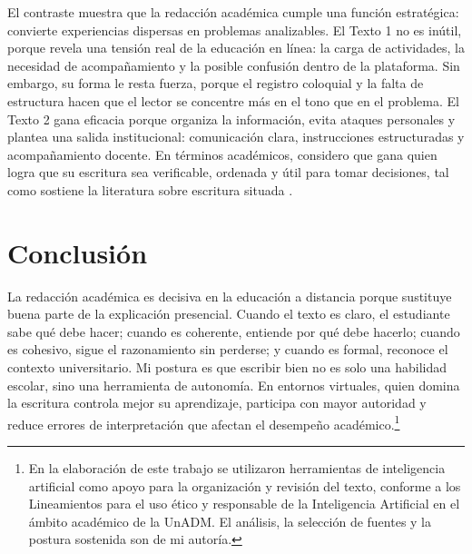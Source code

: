 \documentclass[
	spanish, %
	letterpaper, oneside
]{article}
\begin{document}
El contraste muestra que la redacción académica cumple una función estratégica: convierte experiencias dispersas en problemas analizables. El Texto 1 no es inútil, porque revela una tensión real de la educación en línea: la carga de actividades, la necesidad de acompañamiento y la posible confusión dentro de la plataforma. Sin embargo, su forma le resta fuerza, porque el registro coloquial y la falta de estructura hacen que el lector se concentre más en el tono que en el problema. El Texto 2 gana eficacia porque organiza la información, evita ataques personales y plantea una salida institucional: comunicación clara, instrucciones estructuradas y acompañamiento docente. En términos académicos, considero que gana quien logra que su escritura sea verificable, ordenada y útil para tomar decisiones, tal como sostiene la literatura sobre escritura situada \citep{vitoriaEscrituraAcademicaFormacion2019}.

\section{Conclusión}

La redacción académica es decisiva en la educación a distancia porque sustituye buena parte de la explicación presencial. Cuando el texto es claro, el estudiante sabe qué debe hacer; cuando es coherente, entiende por qué debe hacerlo; cuando es cohesivo, sigue el razonamiento sin perderse; y cuando es formal, reconoce el contexto universitario. Mi postura es que escribir bien no es solo una habilidad escolar, sino una herramienta de autonomía. En entornos virtuales, quien domina la escritura controla mejor su aprendizaje, participa con mayor autoridad y reduce errores de interpretación que afectan el desempeño académico.\footnote{En la elaboración de este trabajo se utilizaron herramientas de inteligencia artificial como apoyo para la organización y revisión del texto, conforme a los Lineamientos para el uso ético y responsable de la Inteligencia Artificial en el ámbito académico de la UnADM. El análisis, la selección de fuentes y la postura sostenida son de mi autoría.}



\end{document}
